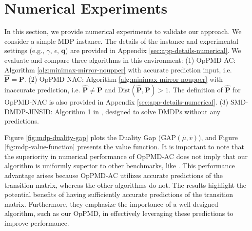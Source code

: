 \documentclass[12pt]{article}
\newtheorem{lemma}{Lemma}
\begin{document}

\section{Numerical Experiments}

\label{sec:numerical}

In this section, we provide numerical experiments to validate our approach. We consider a simple MDP instance. The details of the instance and experimental settings (e.g., $\gamma$, $\epsilon$, $\boldsymbol{q}$) are provided in Appendix \ref{sec:app-details-numerical}. We evaluate and compare three algorithms in this environment: (1) OpPMD-AC: Algorithm \ref{alg:minimax-mirror-noupper} with accurate prediction input, i.e. $\hat{\boldsymbol{\text{P}}} = \boldsymbol{\text{P}}$. (2) OpPMD-NAC: Algorithm \ref{alg:minimax-mirror-noupper} with inaccurate prediction, i.e. $\hat{\boldsymbol{\text{P}}} \ne \boldsymbol{\text{P}}$ and $\text{Dist}(\hat{\boldsymbol{\text{P}}} , \boldsymbol{\text{P}}) > 1$. The definition of $\hat{\boldsymbol{\text{P}}}$ for OpPMD-NAC is also provided in Appendix \ref{sec:app-details-numerical}. (3) SMD-DMDP-JINSID: Algorithm 1 in \cite{jin2020efficiently}, designed to solve DMDPs without any predictions.

Figure \ref{fig:mdp-duality-gap} plots the Duality Gap ($\text{GAP}(\bar{\mu}, \bar{v})$), and Figure \ref{fig:mdp-value-function} presents the value function. It is important to note that the superiority in numerical performance of OpPMD-AC does not imply that our algorithm is uniformly superior to other benchmarks, like \cite{jin2020efficiently}. This performance advantage arises because OpPMD-AC utilizes accurate predictions of the transition matrix, whereas the other algorithms do not. The results highlight the potential benefits of having sufficiently accurate predictions of the transition matrix. Furthermore, they emphasize the importance of a well-designed algorithm, such as our OpPMD, in effectively leveraging these predictions to improve performance.
\end{document}
